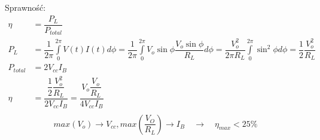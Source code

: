 \documentclass[10pt,a4paper]{article}
\begin{document}
Sprawność:
\begin{align*}
\eta &= \dfrac{P_L}{P_{total}}\\
P_L &= \dfrac{1}{2\pi} \int \limits^{2 \pi}_{0} V(t)I(t)d\phi = \dfrac{1}{2 \pi} \int \limits^{2 \pi}_{0} V_o \sin \phi \dfrac{V_o \sin \phi}{R_L} d\phi = \dfrac{V_o^2}{2 \pi R_L} \int \limits^{2 \pi}_{0} \sin^2 \phi d\phi = \dfrac{1}{2}\dfrac{V_o^2}{R_L} \\
P_{total} &= 2 V_{cc} I_B \\
\eta &= \dfrac{\dfrac{1}{2} \dfrac{V_o^2}{R_L}}{2 V_{cc} I_B} = \dfrac{V_o \dfrac{V_o}{R_L}}{4 V_{cc} I_B} \\
\end{align*}
\begin{equation}
max(V_o)\rightarrow V_{cc}, max(\dfrac{V_O}{R_L})\rightarrow I_B \quad \rightarrow \quad \eta_{max} < 25\% \nonumber
\end{equation}
\end{document}
